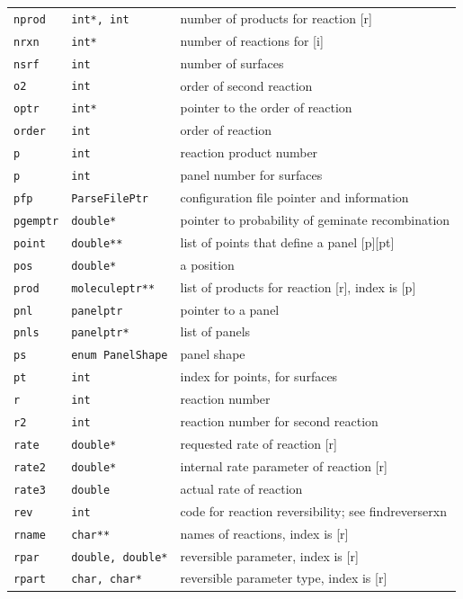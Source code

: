 \documentclass {scrbook}
\newcommand {\ttt} {\texttt}
\begin{document}
\begin{longtable}[c]{lll}
\ttt{nprod} & \ttt{int*, int} & number of products for reaction [r]\\
\ttt{nrxn} & \ttt{int*} & number of reactions for [i]\\
\ttt{nsrf} & \ttt{int} & number of surfaces\\
\ttt{o2} & \ttt{int} & order of second reaction\\
\ttt{optr} & \ttt{int*} & pointer to the order of reaction\\
\ttt{order} & \ttt{int} & order of reaction\\
\ttt{p} & \ttt{int} & reaction product number\\
\ttt{p} & \ttt{int} & panel number for surfaces\\
\ttt{pfp} & \ttt{ParseFilePtr} & configuration file pointer and information\\
\ttt{pgemptr} & \ttt{double*} & pointer to probability of geminate recombination\\
\ttt{point} & \ttt{double**} & list of points that define a panel [p][pt]\\
\ttt{pos} & \ttt{double*} & a position\\
\ttt{prod} & \ttt{moleculeptr**} & list of products for reaction [r], index is [p]\\
\ttt{pnl} & \ttt{panelptr} & pointer to a panel\\
\ttt{pnls} & \ttt{panelptr*} & list of panels\\
\ttt{ps} & \ttt{enum PanelShape} & panel shape\\
\ttt{pt} & \ttt{int} & index for points, for surfaces\\
\ttt{r} & \ttt{int} & reaction number\\
\ttt{r2} & \ttt{int} & reaction number for second reaction\\
\ttt{rate} & \ttt{double*} & requested rate of reaction [r]\\
\ttt{rate2} & \ttt{double*} & internal rate parameter of reaction [r]\\
\ttt{rate3} & \ttt{double} & actual rate of reaction\\
\ttt{rev} & \ttt{int} & code for reaction reversibility; see findreverserxn\\
\ttt{rname} & \ttt{char**} & names of reactions, index is [r]\\
\ttt{rpar} & \ttt{double, double*} & reversible parameter, index is [r]\\
\ttt{rpart} & \ttt{char, char*} & reversible parameter type, index is [r]\\

\end{longtable}
\end{document}
